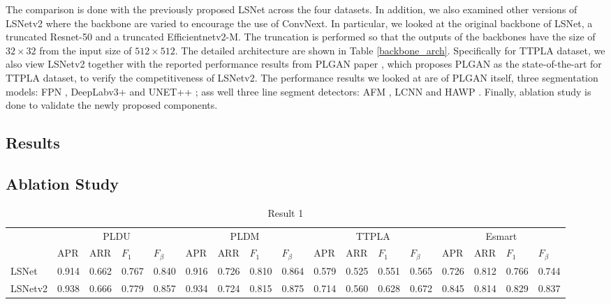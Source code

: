 \documentclass[journal]{IEEEtran}
\begin{document}
The comparison is done with the previously proposed LSNet across the four datasets. In addition, we also examined other versions of LSNetv2 where the backbone are varied to encourage the use of ConvNext. In particular, we looked at the original backbone of LSNet, a truncated Resnet-50 \cite{resnet} and a truncated Efficientnetv2-M\cite{efficientnetv2}. The truncation is performed so that the outputs of the backbones have the size of $32 \times 32$ from the input size of $512 \times 512$. The detailed architecture are shown in Table \ref{backbone_arch}. Specifically for TTPLA dataset, we also view LSNetv2 together with the reported performance results from PLGAN paper \cite{related_work_rabab_abdelfattah_2022}, which proposes PLGAN as the state-of-the-art for TTPLA dataset, to verify the competitiveness of LSNetv2. The performance results we looked at are of PLGAN itself, three segmentation models: FPN \cite{fpn}, DeepLabv3+ \cite{deeplapv3} and UNET++ \cite{unetplusplus}; ass well three line segment detectors: AFM \cite{afm}, LCNN \cite{lcnn} and HAWP \cite{hawp}. Finally, ablation study is done to validate the newly proposed components. 

\subsection{Results}

\subsection{Ablation Study}



\begin{table}[]
\begin{tabular}{lllll|llll|llll|llll}
        & \multicolumn{4}{c|}{PLDU}           & \multicolumn{4}{c|}{PLDM}           & \multicolumn{4}{c|}{TTPLA}          & \multicolumn{4}{c}{Esmart}          \\ \cline{2-17} 
        & APR   & ARR   & $F_1$ & $F_{\beta}$ & APR   & ARR   & $F_1$ & $F_{\beta}$ & APR   & ARR   & $F_1$ & $F_{\beta}$ & APR   & ARR   & $F_1$ & $F_{\beta}$ \\ \hline
LSNet   & 0.914 & 0.662 & 0.767 & 0.840       & 0.916 & 0.726 & 0.810 & 0.864       & 0.579 & 0.525 & 0.551 & 0.565       & 0.726 & 0.812 & 0.766 & 0.744       \\
LSNetv2 & 0.938 & 0.666 & 0.779 & 0.857       & 0.934 & 0.724 & 0.815 & 0.875       & 0.714 & 0.560 & 0.628 & 0.672       & 0.845 & 0.814 & 0.829 & 0.837      
\end{tabular}
\caption{\label{res1_table} Result 1}
\end{table}
\end{document}
